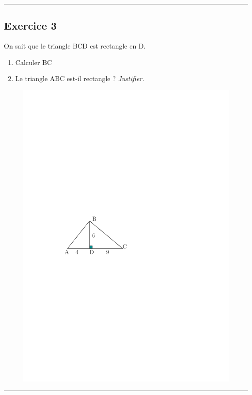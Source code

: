 \documentclass[12pt]{article}
\newcommand{\horrule}[1]{\rule{\linewidth}{#1}} %
\begin{document}
\horrule{1px}

\begin{multicols}{2}

  \subsection*{Exercice 3}
  On sait que le triangle BCD est rectangle en D.\\
  \begin{enumerate}
  \item Calculer BC
  \item Le triangle ABC est-il rectangle ? \textit{Justifier.}
  \end{enumerate}

  \begin{figure}[H]
    \centering
    \includegraphics[width=0.7\linewidth]{sources/1/exo3-tri.pdf}
  \end{figure}

\end{multicols}

\horrule{1px}
\end{document}

